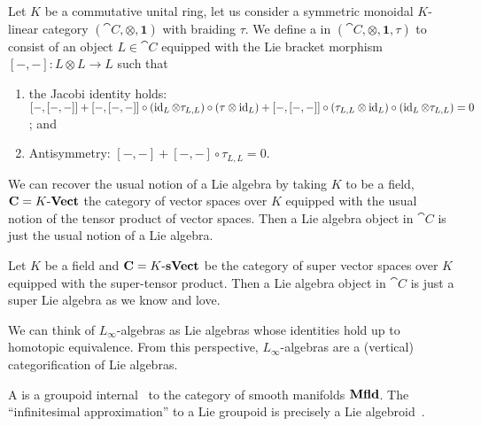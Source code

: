 \begin{node}\label{hda-0005}%
\begin{definition}\label{hda-0004}%
Let $K$ be a commutative unital ring, let us consider a symmetric monoidal
$K$-linear category $(\cat{C},\otimes,\mathbf{1})$ with braiding $\tau$.
We define a  in $(\cat{C},\otimes,\mathbf{1},\tau)$
to consist of an object $L\in\cat{C}$ equipped with the Lie bracket
morphism $[-,-]\colon L\otimes L\to L$ such that
\begin{enumerate}
\item the Jacobi identity holds: $\left[-,\left[-,-\right]\right]
+ \left[-,\left[-,-\right]\right]\circ(\operatorname{id}_{L}\otimes\tau_{L,L})\circ(\tau\otimes \operatorname{id}_{L})
+ \left[-,\left[-,-\right]\right] \circ (\tau_{L,L}\otimes \operatorname{id}_{L})\circ (\operatorname{id}_{L}\otimes\tau_{L,L}) = 0$;
and
\item Antisymmetry: $[-,-]+[-,-]\circ \tau_{L,L}=0$.
\end{enumerate}
\end{definition}
\begin{node}\label{hda-0006}%
We can recover the usual notion of a Lie algebra by taking $K$ to be a
field, $\mathbf{C}=K\textrm{-}\mathbf{Vect}$ the category of vector spaces over $K$
equipped with the usual notion of the tensor product of vector
spaces. Then a Lie algebra object in $\cat{C}$ is just the usual notion
of a Lie algebra.
\end{node}
\begin{node}\label{hda-0007}%
Let $K$ be a field and $\mathbf{C}=K\textrm{-}\mathbf{sVect}$ be the category of super
vector spaces over $K$ equipped with the super-tensor product. Then a
Lie algebra object in $\cat{C}$ is just a super Lie algebra as we know
and love.
\end{node}
\begin{node}[Generalizations]\label{hda-0008}%
We can think of $L_{\infty}$-algebras as Lie algebras whose identities
hold up to homotopic equivalence. From this perspective,
$L_{\infty}$-algebras are a (vertical) categorification of Lie algebras.
\end{node}
\end{node}

\begin{definition}\label{hda-0009}%
A  is a groupoid internal~ to the
category of smooth manifolds $\mathbf{Mfld}$. The ``infinitesimal
approximation'' to a Lie groupoid is precisely a Lie
algebroid~.
\end{definition}

